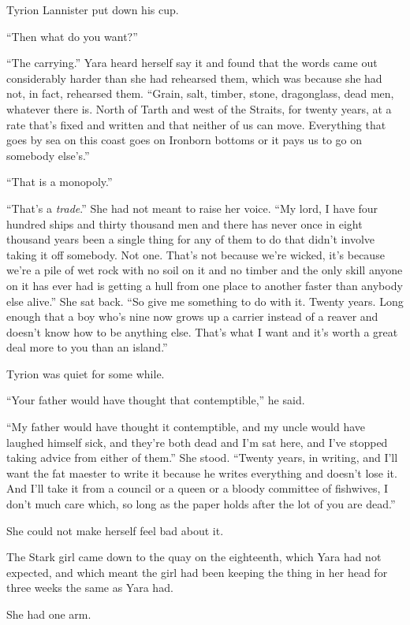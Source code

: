 Tyrion Lannister put down his cup.

“Then what do you want?”

“The carrying.” Yara heard herself say it and found that the words came out considerably harder than she had rehearsed them, which was because she had not, in fact, rehearsed them. “Grain, salt, timber, stone, dragonglass, dead men, whatever there is. North of Tarth and west of the Straits, for twenty years, at a rate that’s fixed and written and that neither of us can move. Everything that goes by sea on this coast goes on Ironborn bottoms or it pays us to go on somebody else’s.”

“That is a monopoly.”

“That’s a \textit{trade}.” She had not meant to raise her voice. “My lord, I have four hundred ships and thirty thousand men and there has never once in eight thousand years been a single thing for any of them to do that didn’t involve taking it off somebody. Not one. That’s not because we’re wicked, it’s because we’re a pile of wet rock with no soil on it and no timber and the only skill anyone on it has ever had is getting a hull from one place to another faster than anybody else alive.” She sat back. “So give me something to do with it. Twenty years. Long enough that a boy who’s nine now grows up a carrier instead of a reaver and doesn’t know how to be anything else. That’s what I want and it’s worth a great deal more to you than an island.”

Tyrion was quiet for some while.

“Your father would have thought that contemptible,” he said.

“My father would have thought it contemptible, and my uncle would have laughed himself sick, and they’re both dead and I’m sat here, and I’ve stopped taking advice from either of them.” She stood. “Twenty years, in writing, and I’ll want the fat maester to write it because he writes everything and doesn’t lose it. And I’ll take it from a council or a queen or a bloody committee of fishwives, I don’t much care which, so long as the paper holds after the lot of you are dead.”

She could not make herself feel bad about it.

\sceneBreak

The Stark girl came down to the quay on the eighteenth, which Yara had not expected, and which meant the girl had been keeping the thing in her head for three weeks the same as Yara had.

She had one arm.

